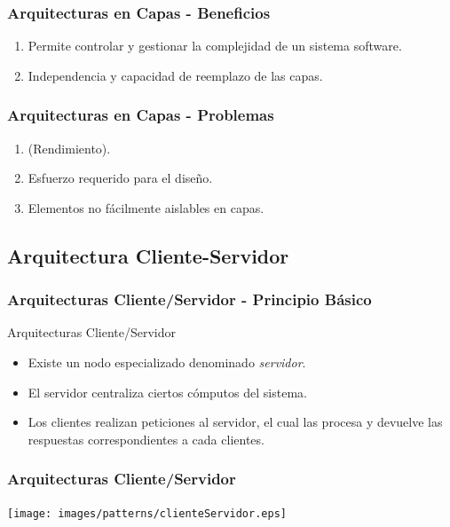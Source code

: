 \documentclass[a4paper,t,xcolor=pst,dvips,colortheme]{beamer}
\begin{document}
\begin{frame}[c]
    \frametitle{Arquitecturas en Capas - Beneficios}
    \begin{enumerate}[<+->]
        \item Permite controlar y gestionar la complejidad de un sistema software.
        \item Independencia y capacidad de reemplazo de las capas.
    \end{enumerate}
\end{frame}

\begin{frame}[c]
    \frametitle{Arquitecturas en Capas - Problemas}
    \begin{enumerate}[<+->]
        \item (Rendimiento).
        \item Esfuerzo requerido para el diseño.
        \item Elementos no fácilmente aislables en capas.
    \end{enumerate}
\end{frame}

\subsection{Arquitectura Cliente-Servidor}

\begin{frame}[c]
    \frametitle{Arquitecturas Cliente/Servidor - Principio Básico}
    \begin{block}{Arquitecturas Cliente/Servidor}
        \begin{itemize}[<+->]
            \item Existe un nodo especializado denominado \emph{servidor}.
            \item El servidor centraliza ciertos cómputos del sistema.
            \item Los clientes realizan peticiones al servidor, el cual las procesa y devuelve las respuestas correspondientes a cada clientes.
        \end{itemize}
    \end{block}
\end{frame}

\begin{frame}[c]
	\frametitle{Arquitecturas Cliente/Servidor}
	\begin{center}
        \texttt{[image: images/patterns/clienteServidor.eps]}
	\end{center}
\end{frame}
\end{document}
